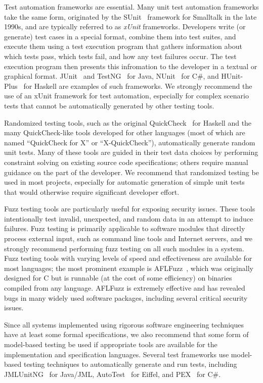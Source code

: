 Test automation frameworks are essential. Many unit test automation
frameworks take the same form, originated by the SUnit~\cite{SUnit}
framework for Smalltalk in the late 1990s, and are typically referred
to as \emph{xUnit} frameworks. Developers write (or generate) test
cases in a special format, combine them into test suites, and execute
them using a test execution program that gathers information about
which tests pass, which tests fail, and how any test failures
occur. The test execution program then presents this infromation to
the developer in a textual or graphical format.  JUnit~\cite{JUnit}
and TestNG~\cite{TestNG} for Java, NUnit~\cite{NUnit} for C\#, and
HUnit-Plus~\cite{HUnit-Plus} for Haskell are examples of such
frameworks. We strongly recommend the use of an xUnit framework for
test automation, especially for complex scenario tests that cannot be
automatically generated by other testing tools.

Randomized testing tools, such as the original
QuickCheck~\cite{QuickCheck} for Haskell and the many QuickCheck-like
tools developed for other languages (most of which are named
``QuickCheck for X'' or ``X-QuickCheck''), automatically generate
random unit tests. Many of these tools are guided in their test data
choices by performing constraint solving on existing source code
specifications; others require manual guidance on the part of the
developer. We recommend that randomized testing be used in most
projects, especially for automatic generation of simple unit tests
that would otherwise require significant developer effort.

Fuzz testing tools are particularly useful for exposing security
issues. These tools intentionally test invalid, unexpected, and random
data in an attempt to induce failures. Fuzz testing is primarily
applicable to software modules that directly process external input,
such as command line tools and Internet servers, and we strongly
recommend performing fuzz testing on all such modules in a
system. Fuzz testing tools with varying levels of speed and
effectiveness are available for most languages; the most prominent
example is AFLFuzz~\cite{AFLFuzz}, which was originally designed for C
but is runnable (at the cost of some efficiency) on binaries compiled
from any language. AFLFuzz is extremely effective and has revealed
bugs in many widely used software packages, including several critical
security issues.

Since all systems implemented using rigorous software engineering
techniques have at least some formal specifications, we also recommend
that some form of model-based testing be used if appropriate tools are
available for the implementation and specification languages. Several
test frameworks use model-based testing techniques to automatically
generate and run tests, including JMLUnitNG~\cite{ZimmermanNagmoti10}
for Java/JML, AutoTest~\cite{AutoTest10} for Eiffel, and
PEX~\cite{PEX08} for C\#.


